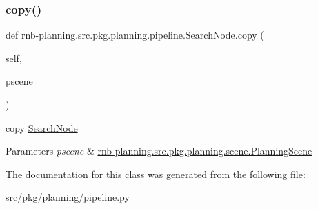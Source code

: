 \subsubsection{\texorpdfstring{copy()}{copy()}}
{\footnotesize\ttfamily def rnb-\/planning.\+src.\+pkg.\+planning.\+pipeline.\+Search\+Node.\+copy (\begin{DoxyParamCaption}\item[{}]{self,  }\item[{}]{pscene }\end{DoxyParamCaption})}



copy \hyperlink{classrnb-planning_1_1src_1_1pkg_1_1planning_1_1pipeline_1_1_search_node}{Search\+Node} 


\begin{DoxyParams}{Parameters}
{\em pscene} & \hyperlink{classrnb-planning_1_1src_1_1pkg_1_1planning_1_1scene_1_1_planning_scene}{rnb-\/planning.\+src.\+pkg.\+planning.\+scene.\+Planning\+Scene} \\
\hline
\end{DoxyParams}


The documentation for this class was generated from the following file\+:\begin{DoxyCompactItemize}
\item 
src/pkg/planning/pipeline.\+py\end{DoxyCompactItemize}
